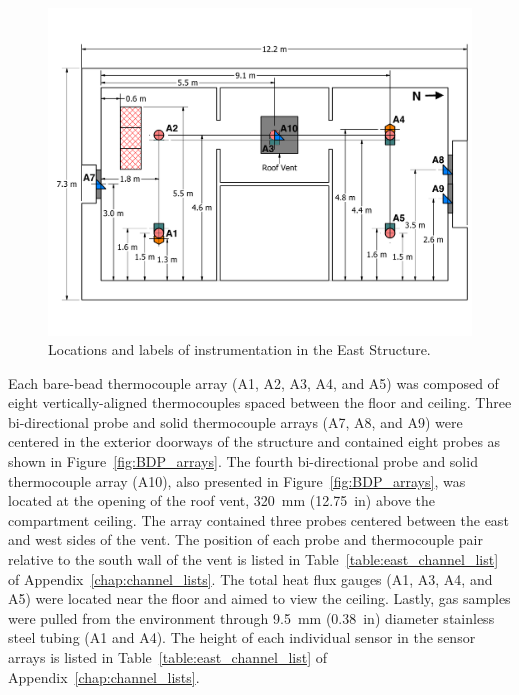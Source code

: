 \begin{figure}[!h]
	\centering
	\includegraphics[width=\columnwidth]{Figures/Floor_Plans/East_Structure_Dimensioned_Instrumentation_New}
	\caption[Locations and labels of instrumentation in the East Structure]{Locations and labels of instrumentation in the East Structure.}
	\label{fig:east_instrumentation}
\end{figure}
\FloatBarrier

Each bare-bead thermocouple array (A1, A2, A3, A4, and A5) was composed of eight vertically-aligned thermocouples spaced between the floor and ceiling. Three bi-directional probe and solid thermocouple arrays (A7, A8, and A9) were centered in the exterior doorways of the structure and contained eight probes as shown in Figure~\ref{fig:BDP_arrays}. The fourth bi-directional probe and solid thermocouple array (A10), also presented in Figure~\ref{fig:BDP_arrays}, was located at the opening of the roof vent, 320~mm (12.75~in) above the compartment ceiling. The array contained three probes centered between the east and west sides of the vent. The position of each probe and thermocouple pair relative to the south wall of the vent is listed in Table~\ref{table:east_channel_list} of Appendix~\ref{chap:channel_lists}. The total heat flux gauges (A1, A3, A4, and A5) were located near the floor and aimed to view the ceiling. Lastly, gas samples were pulled from the environment through 9.5~mm (0.38~in) diameter stainless steel tubing (A1 and A4). The height of each individual sensor in the sensor arrays is listed in Table~\ref{table:east_channel_list} of Appendix~\ref{chap:channel_lists}.

